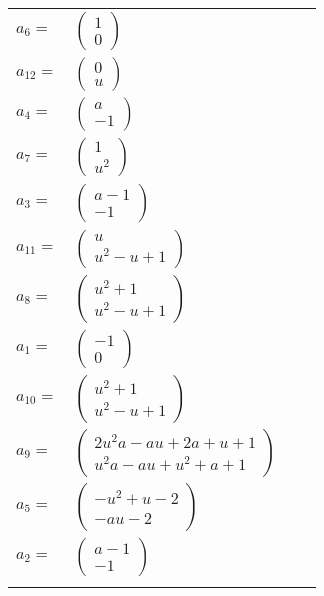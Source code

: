 \documentclass[1p]{elsarticle_modified}
\theoremstyle{definition}
\begin{document}
\begin{tabular}{m{7pt} m{180pt} m{7pt} m{180pt} }
\flushright $a_{6}=$&$\begin{pmatrix}1\\0\end{pmatrix}$ \\
\flushright $a_{12}=$&$\begin{pmatrix}0\\u\end{pmatrix}$ \\
\flushright $a_{4}=$&$\begin{pmatrix}a\\-1\end{pmatrix}$ \\
\flushright $a_{7}=$&$\begin{pmatrix}1\\u^2\end{pmatrix}$ \\
\flushright $a_{3}=$&$\begin{pmatrix}a-1\\-1\end{pmatrix}$ \\
\flushright $a_{11}=$&$\begin{pmatrix}u\\u^2- u+1\end{pmatrix}$ \\
\flushright $a_{8}=$&$\begin{pmatrix}u^2+1\\u^2- u+1\end{pmatrix}$ \\
\flushright $a_{1}=$&$\begin{pmatrix}-1\\0\end{pmatrix}$ \\
\flushright $a_{10}=$&$\begin{pmatrix}u^2+1\\u^2- u+1\end{pmatrix}$ \\
\flushright $a_{9}=$&$\begin{pmatrix}2 u^2 a- a u+2 a+u+1\\u^2 a- a u+u^2+a+1\end{pmatrix}$ \\
\flushright $a_{5}=$&$\begin{pmatrix}- u^2+u-2\\- a u-2\end{pmatrix}$ \\
\flushright $a_{2}=$&$\begin{pmatrix}a-1\\-1\end{pmatrix}$\\&\end{tabular}
\end{document}
